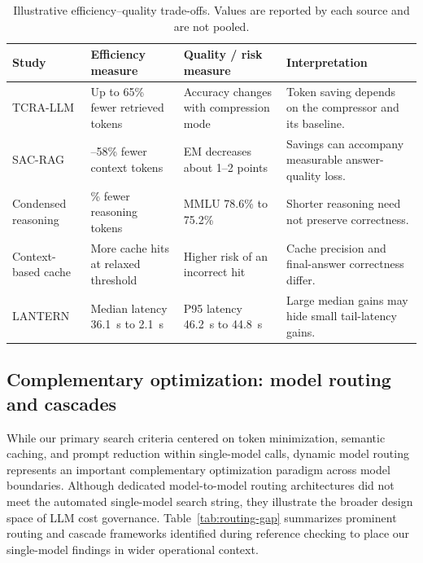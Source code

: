 \IfFileExists{jair.cls}{\documentclass{jair}}{\documentclass[manuscript,nonacm,screen]{acmart}}
\begin{document}
\begin{table}[t]
\caption{Illustrative efficiency--quality trade-offs. Values are reported by each source and are not pooled.}
\label{tab:tradeoff-examples}
\centering
\footnotesize
\begin{tabularx}{\textwidth}{@{}>{\RaggedRight\arraybackslash}p{} >{\RaggedRight\arraybackslash}p{} >{\RaggedRight\arraybackslash}p{} >{\RaggedRight\arraybackslash}X@{}}
\toprule Study & Efficiency measure & Quality / risk measure & Interpretation \\
\midrule
TCRA-LLM \cite{S39} & Up to 65\% fewer retrieved tokens & Accuracy changes with compression mode & Token saving depends on the compressor and its baseline. \\
SAC-RAG \cite{S36} & 38--58\% fewer context tokens & EM decreases about 1--2 points & Savings can accompany measurable answer-quality loss. \\
Condensed reasoning \cite{S13} & 53.1\% fewer reasoning tokens & MMLU 78.6\% to 75.2\% & Shorter reasoning need not preserve correctness. \\
Context-based cache \cite{S15} & More cache hits at relaxed threshold & Higher risk of an incorrect hit & Cache precision and final-answer correctness differ. \\
LANTERN \cite{S29} & Median latency 36.1~s to 2.1~s & P95 latency 46.2~s to 44.8~s & Large median gains may hide small tail-latency gains. \\
\bottomrule
\end{tabularx}
\end{table}

\subsection{Complementary optimization: model routing and cascades}

While our primary search criteria centered on token minimization, semantic caching, and prompt reduction within single-model calls, dynamic model routing represents an important complementary optimization paradigm across model boundaries. Although dedicated model-to-model routing architectures did not meet the automated single-model search string, they illustrate the broader design space of LLM cost governance. Table~\ref{tab:routing-gap} summarizes prominent routing and cascade frameworks identified during reference checking to place our single-model findings in wider operational context.
\end{document}
